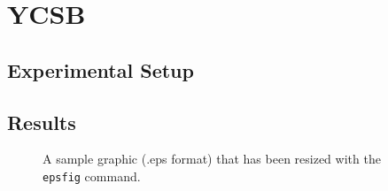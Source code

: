 \documentclass{sig-alternate}
\begin{document}

\section{YCSB}


\subsection{Experimental Setup}

\subsection{Results}
%

\begin{figure}
\centering
{}
\caption{A sample graphic (.eps format)
that has been resized with the \texttt{epsfig} command.}
\end{figure}

\end{document}
